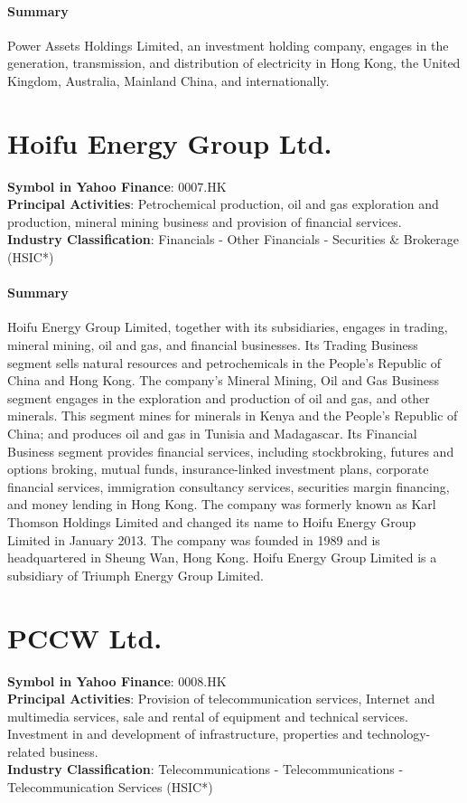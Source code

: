 \paragraph{Summary}
Power Assets Holdings Limited, an investment holding company, engages in the generation, transmission, and distribution of electricity in Hong Kong, the United Kingdom, Australia, Mainland China, and internationally.


\section{Hoifu Energy Group Ltd.}
\textbf{Symbol in Yahoo Finance}: 0007.HK\\
\textbf{Principal Activities}: Petrochemical production, oil and gas exploration and production, mineral mining business and provision of financial services.\\
\textbf{Industry Classification}: Financials - Other Financials - Securities \& Brokerage (HSIC*)
\paragraph{Summary}
Hoifu Energy Group Limited, together with its subsidiaries, engages in trading, mineral mining, oil and gas, and financial businesses. Its Trading Business segment sells natural resources and petrochemicals in the People's Republic of China and Hong Kong. The company's Mineral Mining, Oil and Gas Business segment engages in the exploration and production of oil and gas, and other minerals. This segment mines for minerals in Kenya and the People's Republic of China; and produces oil and gas in Tunisia and Madagascar. Its Financial Business segment provides financial services, including stockbroking, futures and options broking, mutual funds, insurance-linked investment plans, corporate financial services, immigration consultancy services, securities margin financing, and money lending in Hong Kong. The company was formerly known as Karl Thomson Holdings Limited and changed its name to Hoifu Energy Group Limited in January 2013. The company was founded in 1989 and is headquartered in Sheung Wan, Hong Kong. Hoifu Energy Group Limited is a subsidiary of Triumph Energy Group Limited.


\section{PCCW Ltd.}
\textbf{Symbol in Yahoo Finance}: 0008.HK\\
\textbf{Principal Activities}: Provision of telecommunication services, Internet and multimedia services, sale and rental of equipment and technical services. Investment in and development of infrastructure, properties and technology-related business.\\
\textbf{Industry Classification}: Telecommunications - Telecommunications - Telecommunication Services (HSIC*)
